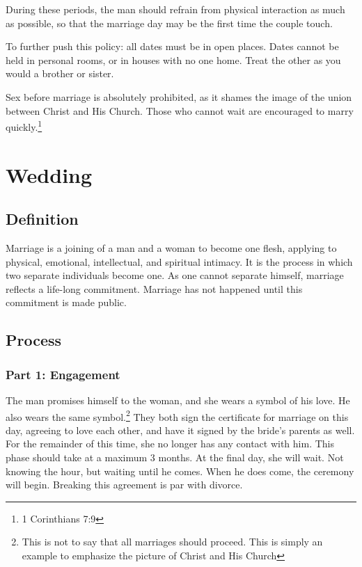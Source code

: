 \documentclass[CSHFoundation.tex]{subfiles}
\begin{document}
During these periods, the man should refrain from physical interaction as much as possible, so that the marriage day may be the first time the couple touch.

To further push this policy: all dates must be in open places. Dates cannot be held in personal rooms, or in houses with no one home. Treat the other as you would a brother or sister.



Sex before marriage is absolutely prohibited, as it shames the image of the union between Christ and His Church. Those who cannot wait are encouraged to marry quickly.\footnote{1 Corinthians 7:9}

\section{Wedding}



\subsection{Definition}

Marriage is a joining of a man and a woman to become one flesh, applying to physical, emotional, intellectual, and spiritual intimacy. It is the process in which two separate individuals become one. As one cannot separate himself, marriage reflects a life-long commitment. Marriage has not happened until this commitment is made public.


\subsection{Process}
\subsubsection{Part 1: Engagement}

The man promises himself to the woman, and she wears a symbol of his love. He also wears the same symbol.\footnote{This is not to say that all marriages should proceed. This is simply an example to emphasize the picture of Christ and His Church} They both sign the certificate for marriage on this day, agreeing to love each other, and have it signed by the bride's parents as well.  For the remainder of this time, she no longer has any contact with him. This phase should take at a maximum 3 months. At the final day, she will wait. Not knowing the hour, but waiting until he comes. When he does come, the ceremony will begin. Breaking this agreement is par with divorce.
\end{document}
